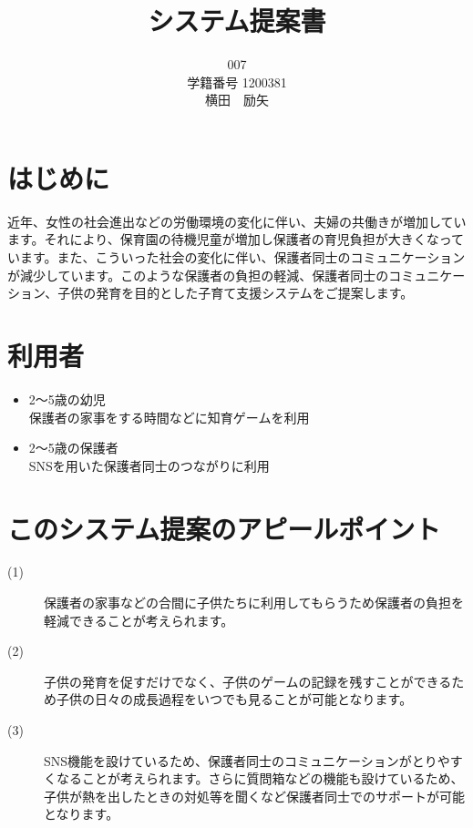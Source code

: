 \documentclass[a4j]{jarticle}
\title{
  \vspace{30mm}
         {\bf システム提案書}
         \\
}
\author{
  \vspace{5mm}
  007 \\
  \vspace{5mm}
  学籍番号 1200381 \\
  \vspace{5mm}
         {\large 横田　励矢}
         \vspace{10mm}
}
\date{
}
\begin{document}
\maketitle

\newpage

\section{はじめに}
近年、女性の社会進出などの労働環境の変化に伴い、夫婦の共働きが増加しています。それにより、保育園の待機児童が増加し保護者の育児負担が大きくなっています。また、こういった社会の変化に伴い、保護者同士のコミュニケーションが減少しています。このような保護者の負担の軽減、保護者同士のコミュニケーション、子供の発育を目的とした子育て支援システムをご提案します。

\newpage
\section{利用者}
\begin{itemize}
\item 2～5歳の幼児\\
  保護者の家事をする時間などに知育ゲームを利用
\item 2～5歳の保護者\\
  SNSを用いた保護者同士のつながりに利用
\end{itemize}


\newpage
\section{このシステム提案のアピールポイント}
\begin{description}
\item[(1)]保護者の家事などの合間に子供たちに利用してもらうため保護者の負担を軽減できることが考えられます。
\item[(2)]子供の発育を促すだけでなく、子供のゲームの記録を残すことができるため子供の日々の成長過程をいつでも見ることが可能となります。
\item[(3)]SNS機能を設けているため、保護者同士のコミュニケーションがとりやすくなることが考えられます。さらに質問箱などの機能も設けているため、子供が熱を出したときの対処等を聞くなど保護者同士でのサポートが可能となります。
\end{description}
\end{document}
